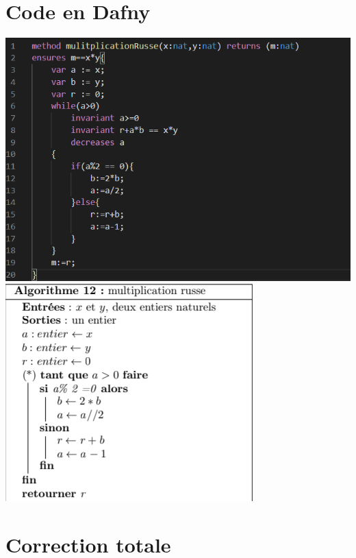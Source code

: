 \documentclass[12pt,a4paper]{report}
\begin{document}
\chapter{Code en Dafny}
\includegraphics[scale=0.45]{algoDafny} 
\includegraphics[scale=0.5]{algoRusse} 




\chapter{Correction totale}
\end{document}
